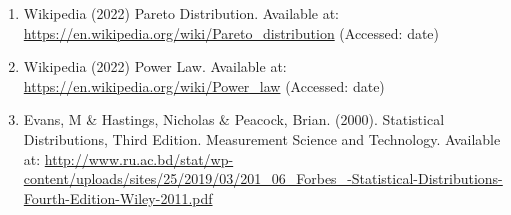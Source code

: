 \documentclass[14pt, a4paper]{article}
\theoremstyle{definition}
\begin{document}
\begin{enumerate}
    \item Wikipedia (2022) Pareto Distribution. Available at: \url{https://en.wikipedia.org/wiki/Pareto_distribution} (Accessed: date)
    \item Wikipedia (2022) Power Law. Available at: \url{https://en.wikipedia.org/wiki/Power_law} (Accessed: date) 
    \item Evans, M & Hastings, Nicholas & Peacock, Brian. (2000). Statistical Distributions, Third Edition. Measurement Science and Technology. Available at: \url{http://www.ru.ac.bd/stat/wp-content/uploads/sites/25/2019/03/201_06_Forbes_-Statistical-Distributions-Fourth-Edition-Wiley-2011.pdf}  
    
\end{enumerate}






 
\end{document}
